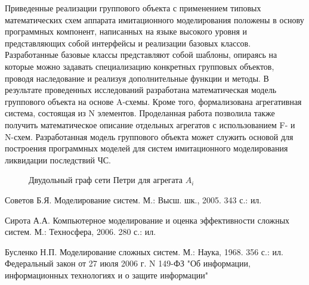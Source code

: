 \documentclass[12pt]{article}
\begin{document}
Приведенные реализации группового объекта с применением типовых математических схем аппарата имитационного моделирования положены в основу программных компонент, написанных на языке высокого
уровня и представляющих собой интерфейсы и реализации базовых классов. Разработанные базовые классы
представляют собой шаблоны, опираясь на которые
можно задавать специализацию конкретных групповых
объектов, проводя наследование и реализуя дополнительные функции и методы.
В результате проведенных исследований разработана математическая модель группового объекта на основе A-схемы. Кроме того, формализована агрегативная
система, состоящая из N элементов. Проделанная работа позволила также получить математическое описание
отдельных агрегатов с использованием F- и N-схем.
Разработанная модель группового объекта может
служить основой для построения программных моделей для систем имитационного моделирования ликвидации последствий ЧС.
\begin{figure}
\caption{Двудольный граф сети Петри для агрегата ${A_i}$}
\end{figure}


\begin{thebibliography}{99}
Советов Б.Я. Моделирование систем. М.: Высш. шк., 2005.
343 с.: ил.

Сирота А.А. Компьютерное моделирование и оценка эффективности сложных систем. М.: Техносфера, 2006.
280 с.: ил.

Бусленко Н.П. Моделирование сложных систем. М.: Наука,
1968. 356 с.: ил.
Федеральный закон от 27 июля 2006 г. N 149-ФЗ "Об информации,
информационных технологиях и о защите информации"


\end{thebibliography}
\end{document}
